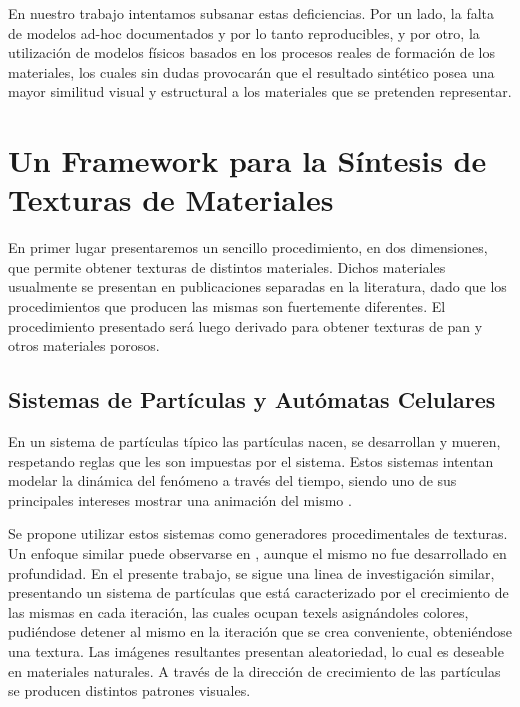 \documentclass[spanish,a4paper,11pt,oneside,links]{report}
\begin{document}
En nuestro trabajo intentamos subsanar estas deficiencias.
Por un lado, la falta de modelos ad-hoc documentados y por lo tanto reproducibles, y por otro, la utilización de modelos físicos basados en los procesos reales de formación de los materiales, los cuales sin dudas provocarán que el resultado sintético posea una mayor similitud visual y estructural a los materiales que se pretenden representar.

\section{Un Framework para la Síntesis de Texturas de Materiales}
En primer lugar presentaremos un sencillo procedimiento, en dos dimensiones, que permite obtener texturas de distintos materiales.
Dichos materiales usualmente se presentan en publicaciones separadas en la literatura, dado que los procedimientos que producen las mismas son fuertemente diferentes.
El procedimiento presentado ser\'a luego derivado para obtener texturas de pan y otros materiales porosos.


\subsection{Sistemas de Partículas y Autómatas Celulares}
En un sistema de part\'iculas t\'ipico las part\'iculas nacen, se desarrollan y mueren, respetando reglas que les son impuestas por el sistema. Estos sistemas intentan modelar la din\'amica del fen\'omeno a trav\'es del tiempo, siendo uno de sus principales intereses mostrar una animaci\'on del mismo \cite{Gao2010, Bagar2010, Lentine2010}.

Se propone utilizar estos sistemas como generadores procedimentales de texturas. Un enfoque similar puede observarse en \cite{Kranidotis98}, aunque el mismo no fue desarrollado en profundidad. En el presente trabajo, se sigue una linea de investigaci\'on similar, presentando un sistema de part\'iculas que est\'a caracterizado por el crecimiento de las mismas en cada iteraci\'on, las cuales ocupan texels asign\'andoles colores, pudi\'endose detener al mismo en la iteraci\'on que se crea conveniente, obteni\'endose una textura. Las im\'agenes resultantes presentan aleatoriedad, lo cual es deseable en materiales naturales. A trav\'es de la direcci\'on de crecimiento de las part\'iculas se producen distintos patrones visuales.
\end{document}
